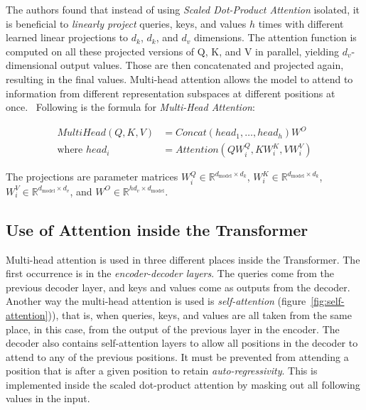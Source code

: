 The authors found that instead of using \textit{Scaled Dot-Product Attention} isolated, it is beneficial to \textit{linearly project} queries, keys, and values $h$ times with different learned linear projections to $d_k$, $d_k$, and $d_v$ dimensions.
The attention function is computed on all these projected versions of Q, K, and V in parallel, yielding $d_v$-dimensional output values.
Those are then concatenated and projected again, resulting in the final values.
Multi-head attention allows the model to attend to information from different representation subspaces at different positions at once.~\cite{attention-is-all-you-need}
Following is the formula for \textit{Multi-Head Attention}:

\begin{align*}
    MultiHead(Q, K, V) &= Concat(head_1, \ldots, head_h) W^O \\
    \text{where }head_i &= Attention(QW^Q_i, KW^K_i, VW^V_i)
\end{align*}

The projections are parameter matrices $W^Q_i \in \mathbb{R}^{d_{\text{model}} \times d_k}$, $W^K_i \in \mathbb{R}^{d_{\text{model}} \times d_k}$, $W^V_i \in \mathbb{R}^{d_{\text{model}} \times d_v}$, and $W^O \in \mathbb{R}^{hd_v \times d_{\text{model}}}$.


\subsection{Use of Attention inside the Transformer}\label{subsec:use-of-attention-inside-the-transformer}

Multi-head attention is used in three different places inside the Transformer.
The first occurrence is in the \textit{encoder-decoder layers}.
The queries come from the previous decoder layer, and keys and values come as outputs from the decoder.
Another way the multi-head attention is used is \textit{self-attention} (figure~\ref{fig:self-attention})), that is, when queries, keys, and values are all taken from the same place, in this case, from the output of the previous layer in the encoder.
The decoder also contains self-attention layers to allow all positions in the decoder to attend to any of the previous positions.
It must be prevented from attending a position that is after a given position to retain \textit{auto-regressivity}.
This is implemented inside the scaled dot-product attention by masking out all following values in the input.~\cite{attention-is-all-you-need}

